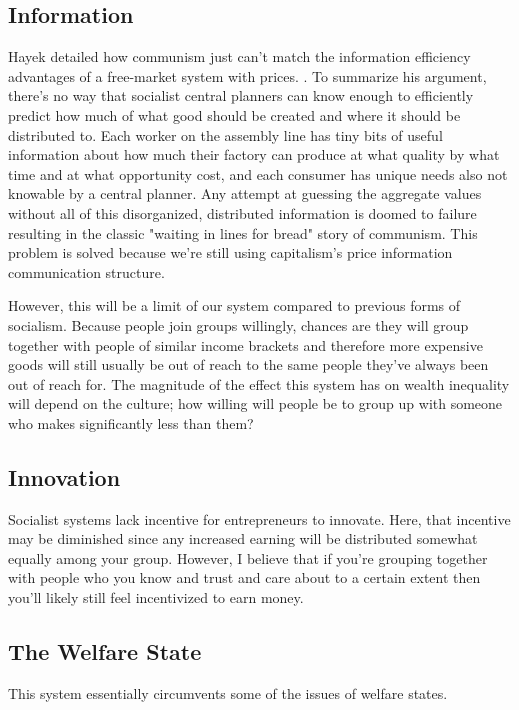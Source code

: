 \documentclass{article}[10pt]
\begin{document}
\subsection{Information} 
Hayek detailed how communism just can't match the information efficiency advantages of a free-market system with prices. \autocite{hayek1945use}. 
To summarize his argument, there's no way that socialist central planners can know enough to efficiently predict how much of what good should be created and where it should be distributed to. 
Each worker on the assembly line has tiny bits of useful information about how much their factory can produce at what quality by what time and at what opportunity cost, and each consumer has unique needs also not knowable by a central planner.
Any attempt at guessing the aggregate values without all of this disorganized, distributed information is doomed to failure resulting in the classic "waiting in lines for bread" story of communism. 
This problem is solved because we're still using capitalism's price information communication structure. \par
However, this will be a limit of our system compared to previous forms of socialism.
Because people join groups willingly, chances are they will group together with people of similar income brackets and therefore more expensive goods will still usually be out of reach to the same people they've always been out of reach for. 
The magnitude of the effect this system has on wealth inequality will depend on the culture; how willing will people be to group up with someone who makes significantly less than them?

\subsection{Innovation} 
Socialist systems lack incentive for entrepreneurs to innovate.
Here, that incentive may be diminished since any increased earning will be distributed somewhat equally among your group.
However, I believe that if you're grouping together with people who you know and trust and care about to a certain extent then you'll likely still feel incentivized to earn money. 

\subsection{The Welfare State}
This system essentially circumvents some of the issues of welfare states. 
\end{document}
